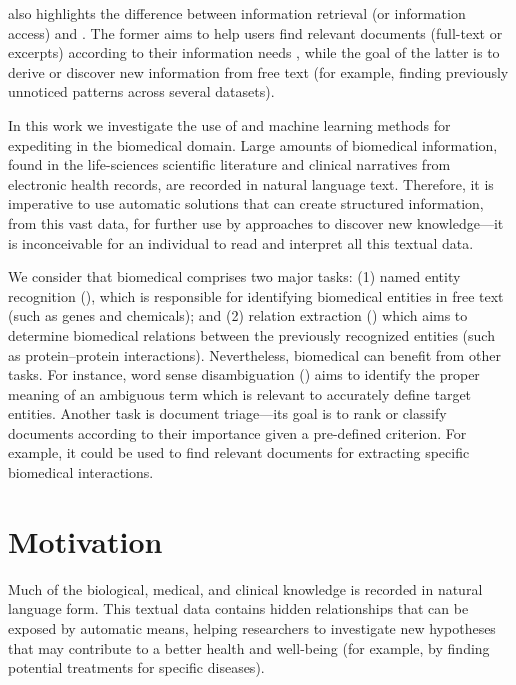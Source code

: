 \textcite{hearst1999a} also highlights the difference between information retrieval (or information access) and . The former aims to help users find relevant documents (full-text or excerpts) according to their information needs \parencite{baezayates1999a}, while the goal of the latter is to derive or discover new information from free text (for example, finding previously unnoticed patterns across several datasets).

In this work we investigate the use of  and machine learning methods for expediting  in the biomedical domain.
Large amounts of biomedical information, found in the life-sciences scientific literature and clinical narratives from electronic health records, are recorded in natural language text.
Therefore, it is imperative to use automatic  solutions that can create structured information, from this vast data, for further use by  approaches to discover new knowledge---it is inconceivable for an individual to read and interpret all this textual data.

We consider that biomedical  comprises two major tasks: (1) named entity recognition (), which is responsible for identifying biomedical entities in free text (such as genes and chemicals); and (2) relation extraction () which aims to determine biomedical relations between the previously recognized entities (such as protein--protein interactions).
Nevertheless, biomedical  can benefit from other  tasks.
For instance, word sense disambiguation () aims to identify the proper meaning of an ambiguous term which is relevant to accurately define target entities.
Another task is document triage---its goal is to rank or classify documents according to their importance given a pre-defined criterion. For example, it could be used to find relevant documents for extracting specific biomedical interactions.


\section{Motivation}

Much of the biological, medical, and clinical knowledge is recorded in natural language form.
This textual data contains hidden relationships that can be exposed by automatic means, helping researchers to investigate new hypotheses that may contribute to a better health and well-being (for example, by finding potential treatments for specific diseases).

